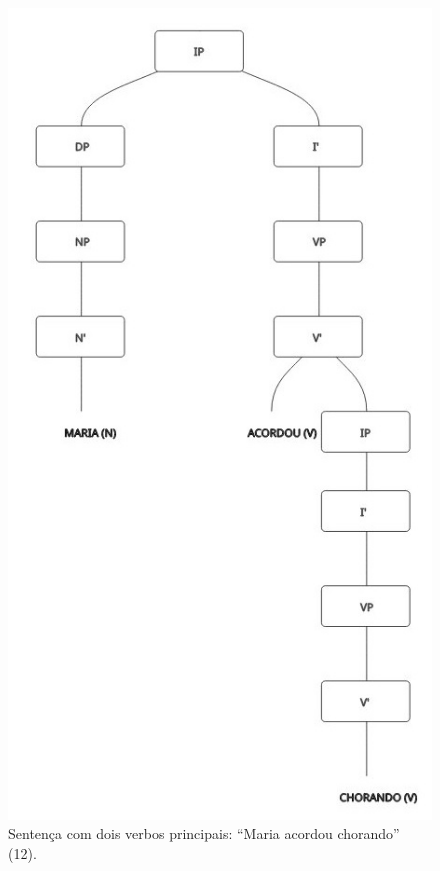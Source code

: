 \documentclass[portuguese]{textolivre}
\begin{document}
\begin{figure}[p]
 \centering
 \includegraphics[width=\textwidth,height=0.85\textheight,keepaspectratio]{Fig6.png}
 \caption{Sentença com dois verbos principais: “Maria acordou chorando” (12).}
 \label{fig6}
\end{figure}
\end{document}

